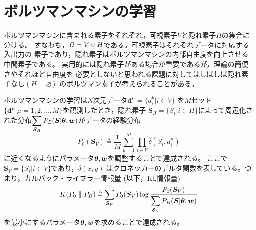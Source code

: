 \section{ボルツマンマシンの学習}
ボルツマンマシンに含まれる素子をそれぞれ，可視素子$V$と隠れ素子$H$の集合に分ける。
すなわち，$\mathit{\Omega}=V\cup H$である。可視素子はそれぞれデータに対応する入出力の
素子であり，隠れ素子はボルツマンマシンの内部自由度を向上させる中間素子である。
実用的には隠れ素子がある場合が重要であるが，理論の簡便さやそれほど自由度を
必要としないと思われる課題に対してはしばしば隠れ素子なし$(H=\varnothing)$
のボルツマン素子が考えられることがある。

ボルツマンマシンの学習は$N$次元データ$\bm{d}^{\mu}=\{d_{i}^{\mu}|i\in V\}$
を$M$セット$\{\bm{d}^{\mu}|\mu=1,2,\ldots,M\}$を観測したとき，隠れ素子
$\bm{S}_{H}=\{S_{i}|i\in H\}$によって周辺化された分布${\displaystyle
\sum_{\bm{S}_{H}}P_{B}(\bm{S}|\boldsymbol{\theta},\bm{w})}$がデータの経験分布
\begin{equation}
P_{0}(\bm{S}_{V})\triangleq\frac{1}{M}\sum_{\mu=1}^{M}
\prod_{i\in V}\delta(S_{i},d_{i}^{\mu})\label{eq:2.13}
\end{equation}
に近くなるようにパラメータ$\boldsymbol{\theta},\bm{w}$を調整することで達成される。
ここで$\bm{S}_{V}=\{S_{i}|i\in V\}$であり，$\delta(x,y)$
はクロネッカーのデルタ関数を表している。つまり，カルバック・ライブラー情報量
(以下，KL情報量)
\begin{equation}
K(P_{0}\parallel P_{B})\triangleq\sum_{\bm{S}_{V}}
P_{0}(\bm{S}_{V})\log\frac{P_{0}(\bm{S}_{V})}
{\displaystyle\sum_{\bm{S}_{H}}P_{B}(\bm{S}|\boldsymbol{\theta},\bm{w})}
\label{eq:2.14}
\end{equation}
を最小にするパラメータ$\boldsymbol{\theta},\bm{w}$を求めることで達成される。

